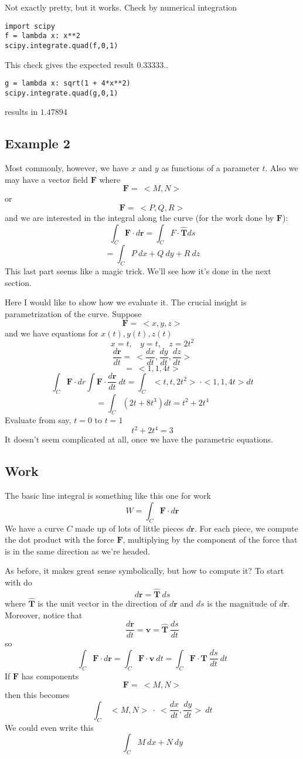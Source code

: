 \documentclass[11pt, oneside]{article}   	%
\begin{document}
Not exactly pretty, but it works.  Check by numerical integration

\begin{verbatim}
import scipy
f = lambda x: x**2
scipy.integrate.quad(f,0,1)
\end{verbatim}
This check gives the expected result $ 0.33333..$

\begin{verbatim}
g = lambda x: sqrt(1 + 4*x**2)
scipy.integrate.quad(g,0,1)
\end{verbatim}
results in $1.47894$

\subsection*{Example 2}
Most commonly, however, we have $x$ and $y$ as functions of a parameter $t$.  Also we may have a vector field $\mathbf{F}$ where
\[ \mathbf{F} = \ <M,N> \]
or
\[ \mathbf{F} = \ <P,Q,R> \]
and we are interested in the integral along the curve (for the work done by $\mathbf{F}$):
\[ \int_C \mathbf{F} \cdot d\mathbf{r} = \int_C F \cdot \hat{\mathbf{T}} ds \]
\[ = \int_C P \ dx + Q \ dy + R \ dz \]
This last part seems like a magic trick.  We'll see how it's done in the next section.

Here I would like to show how we evaluate it.  The crucial insight is parametrization of the curve.  Suppose
\[ \mathbf{F} = \ <x,y,z> \]
and we have equations for $x(t), y(t), z(t)$
\[ x = t, \ \ \ \ y = t, \ \ \ \ z = 2t^2 \]
\[\frac{d\mathbf{r}}{dt} = \ <\frac{dx}{dt},\frac{dy}{dt},\frac{dz}{dt}> \]
\[ = \ <1,1,4t> \]
\[ \int_C \mathbf{F} \cdot dr \int \mathbf{F} \cdot \frac{d\mathbf{r}}{dt} \ dt = \int_C <t,t,2t^2> \  \cdot <1,1,4t> dt \]
\[ = \int_C (2t + 8t^3) dt = t^2 + 2t^4 \]
Evaluate from say, $t=0$ to $t=1$
\[  t^2 + 2t^4 = 3 \]
It doesn't seem complicated at all, once we have the parametric equations.
\vspace{2 mm}

\subsection*{Work}
The basic line integral is something like this one for work
\[ W = \int_C \mathbf{F} \cdot d\mathbf{r} \]
We have a curve $C$ made up of lots of little pieces $d\mathbf{r}$.  For each piece, we compute the dot product with the force $\mathbf{F}$, multiplying by the component of the force that is in the same direction as we're headed.  

As before, it makes great sense symbolically, but how to compute it?  To start with do
\[ d\mathbf{r} = \hat{\mathbf{T}} \ ds \]
where $\hat{\mathbf{T}}$ is the unit vector in the direction of $d\mathbf{r}$ and $ds$ is the magnitude of $d\mathbf{r}$.  Moreover, notice that
\[ \frac{d\mathbf{r}}{dt} = \mathbf{v} = \hat{\mathbf{T}} \ \frac{ds}{dt} \]
so
\[  \int_C \mathbf{F} \cdot d\mathbf{r} =  \int_C \mathbf{F} \cdot \mathbf{v} \ dt =  \int_C \mathbf{F} \cdot \mathbf{T}\ \frac{ds}{dt} \ dt  \]
If $\mathbf{F}$ has components
\[ \mathbf{F} = \ <M,N> \]
then this becomes
\[  \int_C  \ <M,N> \ \cdot \ <\frac{dx}{dt},\frac{dy}{dt}> \ dt \]
We could even write this
\[  \int_C  M \ dx + N \ dy \]
\end{document}
